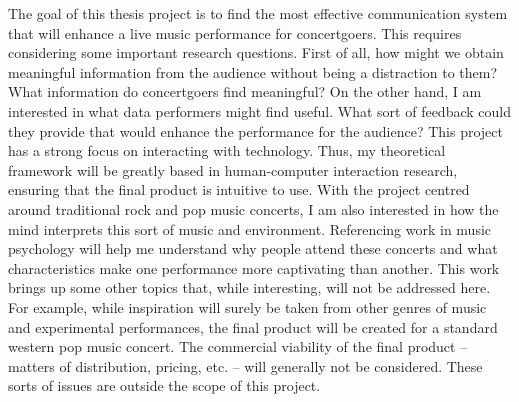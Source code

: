 The goal of this thesis project is to find the most effective communication system that will enhance a live music performance for concertgoers. This requires considering some important research questions. First of all, how might we obtain meaningful information from the audience without being a distraction to them? What information do concertgoers find meaningful? On the other hand, I am interested in what data performers might find useful. What sort of feedback could they provide that would enhance the performance for the audience? This project has a strong focus on interacting with technology. Thus, my theoretical framework will be greatly based in human-computer interaction research, ensuring that the final product is intuitive to use. With the project centred around traditional rock and pop music concerts, I am also interested in how the mind interprets this sort of music and environment. Referencing work in music psychology will help me understand why people attend these concerts and what characteristics make one performance more captivating than another. This work brings up some other topics that, while interesting, will not be addressed here. For example, while inspiration will surely be taken from other genres of music and experimental performances, the final product will be created for a standard western pop music concert. The commercial viability of the final product -- matters of distribution, pricing, etc. -- will generally not be considered.  These sorts of issues are outside the scope of this project.